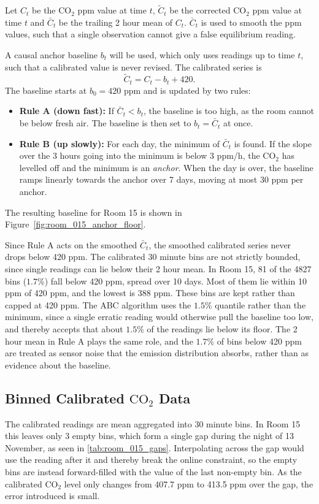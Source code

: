 Let $C_{t}$ be the $\text{CO}_2$ ppm value at time $t$, $\tilde{C}_{t}$ be the corrected $\text{CO}_2$ ppm value at time $t$ and
$\bar{C}_t$ be the trailing 2 hour mean of $C_t$. $\bar{C}_t$ is used to smooth the ppm values, such that a single observation cannot give a false
equilibrium reading.

A causal anchor baseline $b_t$ will be used, which only uses readings up to time $t$,
such that a calibrated value is never revised.
The calibrated series is
\begin{equation} \label{eq:calibration_anchor}
\tilde{C}_{t} = C_{t} - b_{t} + 420.
\end{equation}
The baseline starts at $b_0 = 420$ ppm and is updated by two rules:
\begin{itemize}
    \item \textbf{Rule A (down fast):} If $\bar{C}_t < b_t$, the baseline is too high, as the room
    cannot be below fresh air. The baseline is then set to $b_t = \bar{C}_t$ at once.
    \item \textbf{Rule B (up slowly):} For each day, the minimum of $\bar{C}_t$ is found. If the slope over the
    3 hours going into the minimum is below 3 ppm/h, the $\text{CO}_2$ has levelled off and the minimum is
    an \textit{anchor}. When the day is over, the baseline ramps linearly towards the anchor over 7 days,
    moving at most 30 ppm per anchor.
\end{itemize}
The resulting baseline for Room 15 is shown in Figure~\ref{fig:room_015_anchor_floor}.

Since Rule A acts on the smoothed $\bar{C}_t$, the smoothed calibrated series never drops below 420 ppm. The calibrated
30 minute bins are not strictly bounded, since single readings can lie below their 2 hour mean. In Room 15, 81 of the 4827 bins ($1.7\%$)
fall below 420 ppm, spread over 10 days. Most of them lie within 10 ppm of 420 ppm, and the lowest is 388 ppm.
These bins are kept rather than capped at 420 ppm. The ABC algorithm uses the $1.5\%$ quantile rather than the minimum, since a single
erratic reading would otherwise pull the baseline too low, and thereby accepts that about $1.5\%$ of the readings lie below its floor.
The 2 hour mean in Rule A plays the same role, and the $1.7\%$ of bins below 420 ppm are treated as sensor noise that the
emission distribution absorbs, rather than as evidence about the baseline.

\subsection{Binned Calibrated \texorpdfstring{$\text{CO}_2$}{CO2} Data} \label{sec:binned_calibrated_data}
The calibrated readings are mean aggregated into 30 minute bins. In Room 15 this leaves only 3 empty bins, which form a single
gap during the night of 13 November, as seen in \cref{tab:room_015_gaps}. Interpolating across the gap would use the reading after it
and thereby break the online constraint, so the empty bins are instead forward-filled with the value of the last non-empty bin.
As the calibrated $\text{CO}_2$ level only changes from 407.7 ppm to 413.5 ppm over the gap, the error introduced is small.


